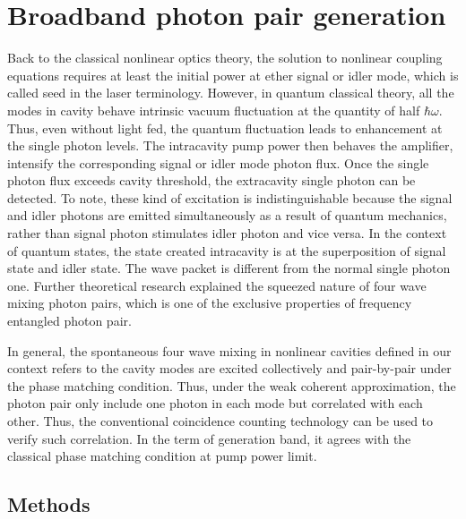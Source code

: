 \chapter{Broadband photon pair generation}

Back to the classical nonlinear optics theory, the solution to nonlinear coupling equations requires at least the initial power at ether signal or idler mode, which is called seed in the laser terminology. However, in quantum classical theory, all the modes in cavity behave intrinsic vacuum fluctuation at the quantity of half $ \hbar \omega $. Thus, even without light fed, the quantum fluctuation leads to enhancement at the single photon levels. The intracavity pump power then behaves the amplifier, intensify the corresponding signal or idler mode photon flux. Once the single photon flux exceeds cavity threshold, the extracavity single photon can be detected. To note, these kind of excitation is indistinguishable because the signal and idler photons are emitted simultaneously as a result of quantum mechanics, rather than signal photon stimulates idler photon and vice versa. In the context of quantum states, the state created intracavity is at the superposition of signal state and idler state. The wave packet is different from the normal single photon one. Further theoretical research \cite{Scully1997} explained the squeezed nature of four wave mixing photon pairs, which is one of the exclusive properties of frequency entangled photon pair.

In general, the spontaneous four wave mixing in nonlinear cavities defined in our context refers to the cavity modes are excited collectively and pair-by-pair under the phase matching condition. Thus, under the weak coherent approximation, the photon pair only include one photon in each mode but correlated with each other. Thus, the conventional coincidence counting technology can be used to verify such correlation. In the term of generation band, it agrees with the classical phase matching condition at pump power limit.


\section{Methods}

